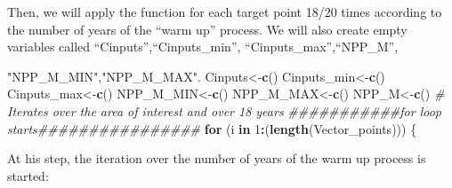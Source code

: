 \documentclass[
  10pt,
  b5paper,
]{book}
\newenvironment{Shaded}{\begin{snugshade}}{\end{snugshade}}
\newcommand{\CommentTok}[1]{\textcolor[rgb]{0.56,0.35,0.01}{\textit{#1}}}
\newcommand{\ControlFlowTok}[1]{\textcolor[rgb]{0.13,0.29,0.53}{\textbf{#1}}}
\newcommand{\DecValTok}[1]{\textcolor[rgb]{0.00,0.00,0.81}{#1}}
\newcommand{\KeywordTok}[1]{\textcolor[rgb]{0.13,0.29,0.53}{\textbf{#1}}}
\newcommand{\NormalTok}[1]{#1}
\newcommand{\OperatorTok}[1]{\textcolor[rgb]{0.81,0.36,0.00}{\textbf{#1}}}
\newcommand{\StringTok}[1]{\textcolor[rgb]{0.31,0.60,0.02}{#1}}
\begin{document}
Then, we will apply the function for each target point 18/20 times according to the number of years of the ``warm up'' process. We will also create empty variables called ``Cinputs'',``Cinputs\_min'', ``Cinputs\_max'',``NPP\_M'',

\begin{Shaded}
\begin{Highlighting}[]
\StringTok{"NPP_M_MIN"}\NormalTok{,}\StringTok{"NPP_M_MAX"}\NormalTok{.}
\NormalTok{Cinputs<-}\KeywordTok{c}\NormalTok{()}
\NormalTok{Cinputs_min<-}\KeywordTok{c}\NormalTok{()}
\NormalTok{Cinputs_max<-}\KeywordTok{c}\NormalTok{()}
\NormalTok{NPP_M_MIN<-}\KeywordTok{c}\NormalTok{()}
\NormalTok{NPP_M_MAX<-}\KeywordTok{c}\NormalTok{()}
\NormalTok{NPP_M<-}\KeywordTok{c}\NormalTok{()}
\CommentTok{# Iterates over the area of interest and over 18 years }
\CommentTok{###########for loop starts################}
\ControlFlowTok{for}\NormalTok{ (i }\ControlFlowTok{in} \DecValTok{1}\OperatorTok{:}\NormalTok{(}\KeywordTok{length}\NormalTok{(Vector_points))) \{}
\end{Highlighting}
\end{Shaded}

At his step, the iteration over the number of years of the warm up process is started:
\end{document}
